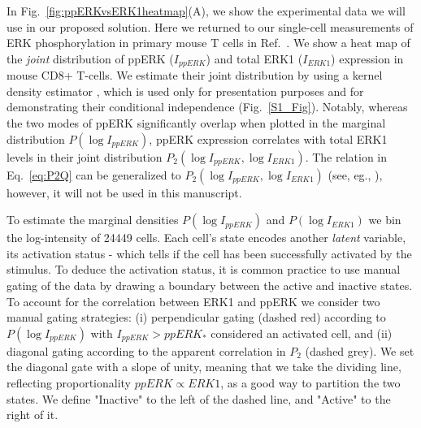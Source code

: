 \documentclass[11pt,a4paper,draft]{article}
\begin{document}
\smallskip
In Fig.~\ref{fig:ppERKvsERK1heatmap}(A), we show the experimental data we will use in our proposed solution. Here we returned to our single-cell measurements of ERK phosphorylation in primary mouse T cells in Ref.~\cite{Feinerman2008}. We show a heat map of the \emph{joint} distribution of ppERK ($I_{ppERK}$) and total ERK1 ($I_{ERK1}$) expression in mouse CD8+ T-cells. We estimate their joint distribution by using a kernel density estimator \cite{botev2010}, which is used only for presentation purposes and for demonstrating their conditional independence (Fig.~\ref{S1_Fig}).
Notably, whereas the two modes of ppERK significantly overlap when plotted in the marginal distribution $P(\log I_{ppERK})$, ppERK expression correlates with total ERK1 levels in their joint distribution $P_2(\log I_{ppERK},\log I_{ERK1})$. The relation in Eq.~\ref{eq:P2Q} can be generalized to $P_2(\log I_{ppERK},\log I_{ERK1})$ (see, eg., \cite{Mukhopadhyay2000}), however, it will not be used in this manuscript.

\smallskip
To estimate the marginal densities $P(\log I_{ppERK})$ and $P(\log I_{ERK1})$ we bin the log-intensity of 24449 cells.  Each cell's state encodes another \emph{latent} variable, its activation status - which tells if the cell has been successfully activated by the stimulus. To deduce the activation status, it is common practice to use manual gating of the data by drawing a boundary between the active and inactive states. To account for the correlation between ERK1 and ppERK we consider two manual gating strategies: (i) perpendicular gating (dashed red) according to $P(\log I_{ppERK})$ with $I_{ppERK}>ppERK_*$ considered an activated cell, and (ii) diagonal gating according to the apparent correlation in $P_2$ (dashed grey). We set the diagonal gate with a slope of unity, meaning that we take the dividing line, reflecting  proportionality $ppERK\propto ERK1$, as a good way to partition the two states. We define "Inactive" to the left of the dashed line, and "Active" to the right of it.
\smallskip
\end{document}
